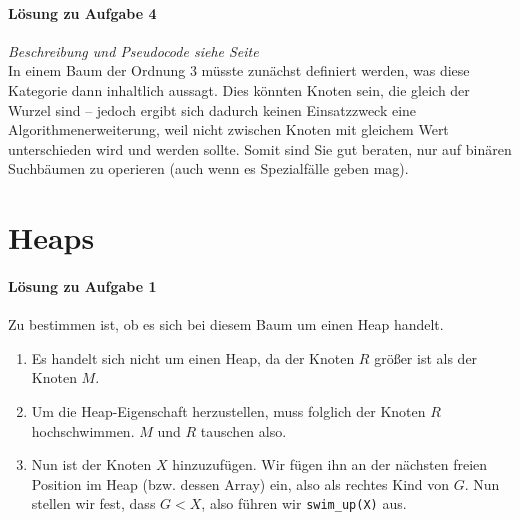 \documentclass[11pt,a4paper]{scrartcl}
\begin{document}
\paragraph{Lösung zu Aufgabe 4}
\label{a4.4:lsg}
\textit{Beschreibung und Pseudocode siehe Seite \pageref{searchBinTree}} \\
In einem Baum der Ordnung 3 müsste zunächst definiert werden, was diese Kategorie dann inhaltlich aussagt. Dies könnten Knoten sein, die gleich der Wurzel sind -- jedoch ergibt sich dadurch keinen Einsatzzweck eine Algorithmenerweiterung, weil nicht zwischen Knoten mit gleichem Wert unterschieden wird und werden sollte. Somit sind Sie gut beraten, nur auf binären Suchbäumen zu operieren (auch wenn es Spezialfälle geben mag).
\section{Heaps}
\paragraph{Lösung zu Aufgabe 1} Zu bestimmen ist, ob es sich bei diesem Baum um einen Heap handelt.
\label{a5.1:lsg}
\begin{enumerate}
\item Es handelt sich nicht um einen Heap, da der Knoten $R$ größer ist als der Knoten $M$. 
\item Um die Heap-Eigenschaft herzustellen, muss folglich der Knoten $R$ {\glqq}hochschwimmen{\grqq}. $M$ und $R$ tauschen also.
\begin{figure}[h]
\centering
{}
\end{figure}
\item Nun ist der Knoten $X$ hinzuzufügen. Wir fügen ihn an der nächsten freien Position im Heap (bzw. dessen Array) ein, also als rechtes Kind von $G$. Nun stellen wir fest, dass $G < X$, also führen wir \texttt{swim{\_}up(X)} aus. 
\begin{figure}[h]
\centering
{}
\end{figure}
\end{enumerate}
\end{document}
